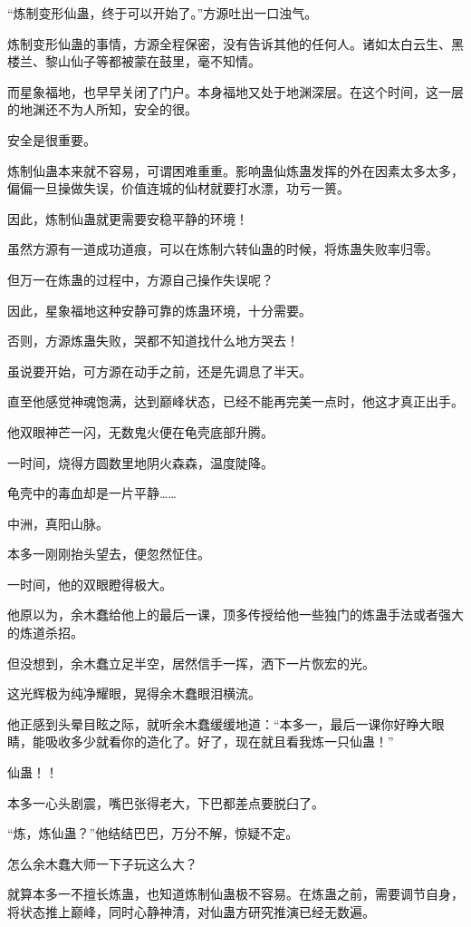 \begin{this_body}
“炼制变形仙蛊，终于可以开始了。”方源吐出一口浊气。

炼制变形仙蛊的事情，方源全程保密，没有告诉其他的任何人。诸如太白云生、黑楼兰、黎山仙子等都被蒙在鼓里，毫不知情。

而星象福地，也早早关闭了门户。本身福地又处于地渊深层。在这个时间，这一层的地渊还不为人所知，安全的很。

安全是很重要。

炼制仙蛊本来就不容易，可谓困难重重。影响蛊仙炼蛊发挥的外在因素太多太多，偏偏一旦操做失误，价值连城的仙材就要打水漂，功亏一篑。

因此，炼制仙蛊就更需要安稳平静的环境！

虽然方源有一道成功道痕，可以在炼制六转仙蛊的时候，将炼蛊失败率归零。

但万一在炼蛊的过程中，方源自己操作失误呢？

因此，星象福地这种安静可靠的炼蛊环境，十分需要。

否则，方源炼蛊失败，哭都不知道找什么地方哭去！

虽说要开始，可方源在动手之前，还是先调息了半天。

直至他感觉神魂饱满，达到巅峰状态，已经不能再完美一点时，他这才真正出手。

他双眼神芒一闪，无数鬼火便在龟壳底部升腾。

一时间，烧得方圆数里地阴火森森，温度陡降。

龟壳中的毒血却是一片平静……

中洲，真阳山脉。

本多一刚刚抬头望去，便忽然怔住。

一时间，他的双眼瞪得极大。

他原以为，余木蠢给他上的最后一课，顶多传授给他一些独门的炼蛊手法或者强大的炼道杀招。

但没想到，余木蠢立足半空，居然信手一挥，洒下一片恢宏的光。

这光辉极为纯净耀眼，晃得余木蠢眼泪横流。

他正感到头晕目眩之际，就听余木蠢缓缓地道：“本多一，最后一课你好睁大眼睛，能吸收多少就看你的造化了。好了，现在就且看我炼一只仙蛊！”

仙蛊！！

本多一心头剧震，嘴巴张得老大，下巴都差点要脱臼了。

“炼，炼仙蛊？”他结结巴巴，万分不解，惊疑不定。

怎么余木蠢大师一下子玩这么大？

就算本多一不擅长炼蛊，也知道炼制仙蛊极不容易。在炼蛊之前，需要调节自身，将状态推上巅峰，同时心静神清，对仙蛊方研究推演已经无数遍。


\end{this_body}
